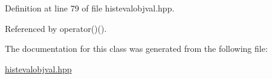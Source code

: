 \-Definition at line 79 of file histevalobjval.\-hpp.



\-Referenced by operator()().



\-The documentation for this class was generated from the following file\-:\begin{DoxyCompactItemize}
\item 
\hyperlink{histevalobjval_8hpp}{histevalobjval.\-hpp}\end{DoxyCompactItemize}
